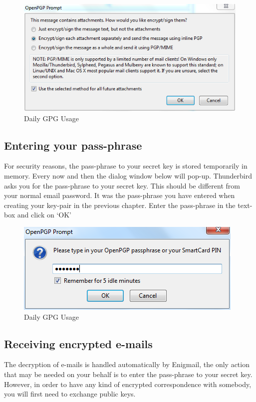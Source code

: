 \begin{figure}[htbp]
\centering
\includegraphics{daily_gpg_1.png}
\caption{Daily GPG Usage}
\end{figure}

\subsection{Entering your pass-phrase}

For security reasons, the pass-phrase to your secret key is stored
temporarily in memory. Every now and then the dialog window below will
pop-up. Thunderbird asks you for the pass-phrase to your secret key.
This should be different from your normal email password. It was the
pass-phrase you have entered when creating your key-pair in the previous
chapter. Enter the pass-phrase in the text-box and click on `OK'

\begin{figure}[htbp]
\centering
\includegraphics{daily_gpg_2.png}
\caption{Daily GPG Usage}
\end{figure}

\subsection{Receiving encrypted e-mails}

The decryption of e-mails is handled automatically by Enigmail, the only
action that may be needed on your behalf is to enter the pass-phrase to
your secret key. However, in order to have any kind of encrypted
correspondence with somebody, you will first need to exchange public
keys.

